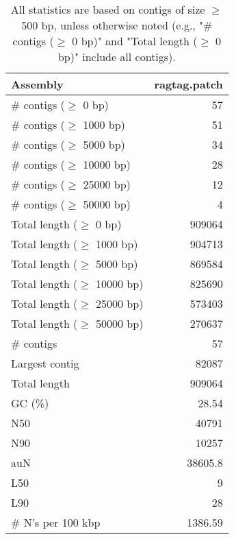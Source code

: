 \documentclass[12pt,a4paper]{article}
\begin{document}
\begin{table}[ht]
\begin{center}
\caption{All statistics are based on contigs of size $\geq$ 500 bp, unless otherwise noted (e.g., "\# contigs ($\geq$ 0 bp)" and "Total length ($\geq$ 0 bp)" include all contigs).}
\begin{tabular}{|l*{1}{|r}|}
\hline
Assembly & ragtag.patch \\ \hline
\# contigs ($\geq$ 0 bp) & 57 \\ \hline
\# contigs ($\geq$ 1000 bp) & 51 \\ \hline
\# contigs ($\geq$ 5000 bp) & 34 \\ \hline
\# contigs ($\geq$ 10000 bp) & 28 \\ \hline
\# contigs ($\geq$ 25000 bp) & 12 \\ \hline
\# contigs ($\geq$ 50000 bp) & 4 \\ \hline
Total length ($\geq$ 0 bp) & 909064 \\ \hline
Total length ($\geq$ 1000 bp) & 904713 \\ \hline
Total length ($\geq$ 5000 bp) & 869584 \\ \hline
Total length ($\geq$ 10000 bp) & 825690 \\ \hline
Total length ($\geq$ 25000 bp) & 573403 \\ \hline
Total length ($\geq$ 50000 bp) & 270637 \\ \hline
\# contigs & 57 \\ \hline
Largest contig & 82087 \\ \hline
Total length & 909064 \\ \hline
GC (\%) & 28.54 \\ \hline
N50 & 40791 \\ \hline
N90 & 10257 \\ \hline
auN & 38605.8 \\ \hline
L50 & 9 \\ \hline
L90 & 28 \\ \hline
\# N's per 100 kbp & 1386.59 \\ \hline
\end{tabular}
\end{center}
\end{table}
\end{document}
